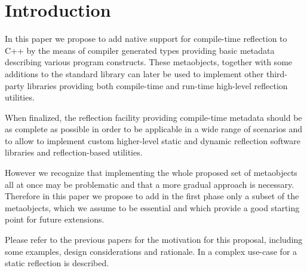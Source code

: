 \section{Introduction}

In this paper we propose to add native support for
compile-time reflection to C++ by the means of compiler generated
types providing basic metadata describing various program constructs.
These metaobjects, together with some additions to the standard
library can later be used to implement other third-party libraries
providing both compile-time and run-time high-level
reflection utilities.

When finalized, the reflection facility providing compile-time metadata
should be as complete as possible in order to be applicable in a wide
range of scenarios and to allow to implement custom higher-level
static and dynamic reflection software libraries and reflection-based
utilities.

However we recognize that implementing the whole proposed set of metaobjects
all at once may be problematic and that a more gradual approach is necessary.
Therefore in this paper we propose to add in the first phase
only a subset of the metaobjects, which we assume to be essential
and which provide a good starting point for future extensions.

Please refer to the previous papers \cite{n3996,n4111,n4451,n4452}
for the motivation for this proposal, including some examples,
design considerations and rationale. In \cite{ITFPWTHOR} a complex use-case
for a static reflection is described.

